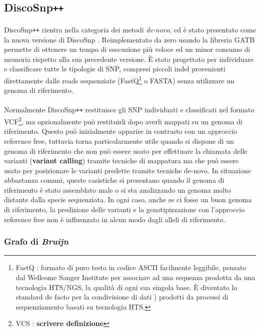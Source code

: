 \documentclass[../main.tex]{subfiles}
\begin{document}
\subsection{DiscoSnp\texttt{++}}
\paragraph{}
DiscoSnp\texttt{++} \cite{peterlongo2017discosnp++} rientra nella categoria dei metodi \textit{de-novo}, ed è stato presentato come la nuova versione di DiscoSnp \cite{uricaru2015reference}. Reimplementato da zero usando la libreria GATB \cite{drezen2014gatb} permette di ottenere un tempo di esecuzione più veloce ed un minor consumo di memoria rispetto alla sua precedente versione. È stato progettato per individuare e classificare tutte le tipologie di SNP, compresi piccoli indel provenienti direttamente dalle reads sequenziate (FastQ\footnote{FastQ :  formato di puro testo in codice ASCII facilmente leggibile, pensato dal Wellcome Sanger Institute per associare ad una sequenza prodotta da una tecnologia HTS/NGS, la qualità di ogni sua singola base. È diventato lo standard de facto per la condivisione di dati \cite{cock2010sanger}) prodotti da processi di sequenziamento basati su tecnologia HTS. } o FASTA) senza utilizzare un genoma di riferimento.

\paragraph{}  Normalmente DiscoSnp\texttt{++} restituisce gli SNP individuati e classificati nel formato VCF\footnote{VCS : \textbf{scrivere definizione}}, ma opzionalmente può restituirli dopo averli mappati su un genoma di riferimento. Questo può inizialmente apparire in contrasto con un approccio reference free, tuttavia torna particolarmente utile quando si dispone di un genoma di riferimento che non può essere usato per effettuare la chiamata delle varianti (\textbf{variant calling}) tramite tecniche di mappatura ma che può essere usato per posizionare le varianti predette tramite tecniche de-novo. In situazione abbastanza comuni, queste casistiche si presentano quando il genoma di riferimento è stato assemblato male o si sta analizzando un genoma molto distante dalla specie sequenziata. In ogni caso, anche se ci fosse un buon genoma di riferimento, la predizione delle varianti e la genotipizzazione con l'approccio reference free non è influenzato in alcun modo dagli alleli di riferimento.

\subsubsection{Grafo di \textit{Bruijn}}
\label{dBG}
\end{document}
